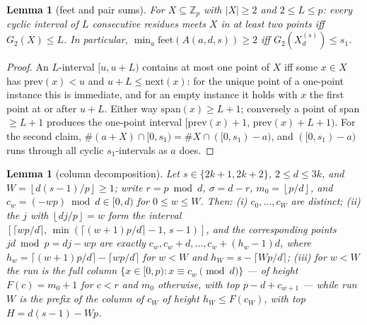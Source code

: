 \documentclass[11pt,a4paper]{article}
\numberwithin{equation}{section}
\theoremstyle{plain}
\theoremstyle{plain}
\newtheorem{lemma}[theorem]{Lemma}
\theoremstyle{definition}
\theoremstyle{remark}
\newcommand{\Z}{\mathbb{Z}}
\newcommand{\floor}[1]{\left\lfloor #1 \right\rfloor}
\begin{document}
\begin{lemma}[feet and pair sums]\label{lem:E0}
For $X\subseteq\Z_p$ with $|X|\ge2$ and $2\le L\le p$: every cyclic
interval of $L$ consecutive residues meets $X$ in at least two points
iff $G_2(X)\le L$. In particular,
$\min_a\mathrm{feet}(A(a,d,s))\ge2$ iff $G_2(X^{(s)}_d)\le s_1$.
\end{lemma}

\begin{proof}
An $L$-interval $[u,u+L)$ contains at most one point of $X$ iff some
$x\in X$ has $\mathrm{prev}(x)<u$ and $u+L\le\mathrm{next}(x)$: for the
unique point of a one-point instance this is immediate, and for an empty
instance it holds with $x$ the first point at or after $u+L$. Either
way $\mathrm{span}(x)\ge L+1$; conversely a point of span $\ge L+1$
produces the one-point interval $[\mathrm{prev}(x)+1,\,
\mathrm{prev}(x)+L+1)$. For the second claim,
$\#(a+X)\cap[0,s_1)=\#X\cap([0,s_1)-a)$, and $([0,s_1)-a)$ runs through
all cyclic $s_1$-intervals as $a$ does.
\end{proof}

\begin{lemma}[column decomposition]\label{lem:E1}
Let $s\in\{2k{+}1,2k{+}2\}$, $2\le d\le3k$, and
$W=\floor{d(s-1)/p}\ge1$; write $r=p\bmod d$, $\sigma=d-r$,
$m_0=\floor{p/d}$, and $c_w=(-wp)\bmod d\in[0,d)$ for $0\le w\le W$.
Then: \textup{(i)} $c_0,\dots,c_W$ are distinct; \textup{(ii)} the $j$
with $\floor{dj/p}=w$ form the interval
$[\lceil wp/d\rceil,\,\min(\lceil(w{+}1)p/d\rceil-1,\,s-1)]$, and the
corresponding points $jd\bmod p=dj-wp$ are exactly
$c_w,c_w+d,\dots,c_w+(h_w-1)d$, where
$h_w=\lceil(w{+}1)p/d\rceil-\lceil wp/d\rceil$ for $w<W$ and
$h_W=s-\lceil Wp/d\rceil$; \textup{(iii)} for $w<W$ the run is the
\emph{full} column $\{x\in[0,p):x\equiv c_w\pmod d\}$ --- of height
$F(c)=m_0+1$ for $c<r$ and $m_0$ otherwise, with top $p-d+c_{w+1}$ ---
while run $W$ is the prefix of the column of $c_W$ of height
$h_W\le F(c_W)$, with top $H=d(s-1)-Wp$.
\end{lemma}
\end{document}
